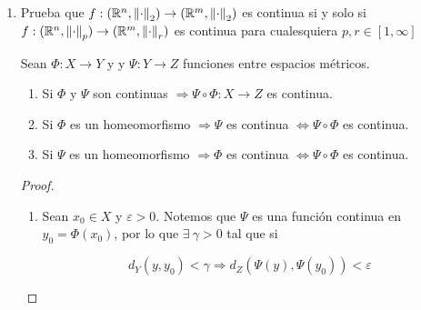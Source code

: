 \documentclass[12pt]{article}
\newcommand\R{\ensuremath{\mathbb{R}}}
\begin{document}
\begin{enumerate}[label=\textbf{\arabic*}.]
\begin{lema}
    Esto implica $\abs{{d}^{\prime}(A,x)-{d}^{\prime}(A,y)} \leqslant d(x,y)$
\end{lema}


\begin{proof}
    Sea $x,y \in X$ f.p.a. Notemos que $\forall \: a \in A$ s.t.q.

    $$ \abs{d(A,x)-d(A,y)} \leqslant d(x,y)$$

    Esto por el Lema anterior, que fue un ejercicio de la tarea anterior. Veamos que es continua. 

    Sea $\varepsilon >0$. Consideremos a $\delta = \varepsilon$. Sucede que
    \begin{align*}
    d(x,y) < \delta && \text{ y } && \abs{d(A,x)-d(A,y)} \leqslant d(x,y) < \delta = \varepsilon
    \end{align*}

    $\therefore f(x) = d(x,A)$ es continua. Note que también es Lipschitz continua con constante 1.
\end{proof}

\item Prueba que $f : (\R^n, {\norm{\cdot}}_{2}) \to (\R^m, {\norm{\cdot}}_{2})$ es continua si y solo si $f: (\R^n, {\norm{\cdot}}_{p}) \to (\R^m, {\norm{\cdot}}_{r})$ es continua para cualesquiera $p,r \in [1,\infty]$

\begin{lema}
Sean $\Phi : X \to Y$ y y $\Psi : Y \to Z$ funciones entre espacios métricos.

    \begin{enumerate}
        \item Si $\Phi$ y $\Psi$ son continuas $\Rightarrow \Psi \circ \Phi : X \to Z$ es continua. 
        \item Si $\Phi$ es un homeomorfismo $\Rightarrow \Psi$ es continua $\Leftrightarrow \Psi \circ \Phi$ es continua.
        \item Si $\Psi$ es un homeomorfismo $\Rightarrow \Phi$ es continua $\Leftrightarrow \Psi \circ \Phi$ es continua.
    \end{enumerate}
\end{lema}

\begin{proof}
    \begin{enumerate}
        \item Sean $x_0 \in X$ y $\varepsilon > 0$. Notemos que $\Psi$ es una función continua en $y_0 = \Phi(x_0)$, por lo que $\exists \: \gamma > 0$ tal que si 

        $$ d_Y(y,y_0) < \gamma \Rightarrow d_Z(\Psi(y),\Psi(y_0)) < \varepsilon$$


\end{enumerate}
\end{proof}
\end{enumerate}
\end{document}
